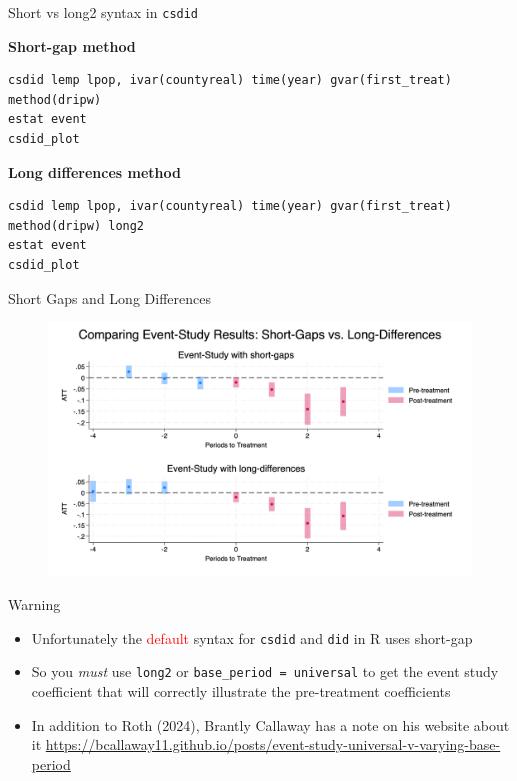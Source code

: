 \documentclass{beamer}
\begin{document}
\begin{frame}[fragile]{Short vs long2 syntax in \texttt{csdid}}
\tiny

\textbf{Short-gap method}
\begin{lstlisting}[basicstyle=\ttfamily]
csdid lemp lpop, ivar(countyreal) time(year) gvar(first_treat) method(dripw)
estat event
csdid_plot
\end{lstlisting}


\textbf{Long differences method}
\begin{lstlisting}[basicstyle=\ttfamily]
csdid lemp lpop, ivar(countyreal) time(year) gvar(first_treat) method(dripw) long2
estat event
csdid_plot
\end{lstlisting}
\end{frame}


\begin{frame}{Short Gaps and Long Differences}

\begin{figure}[h]
    \centering
    \includegraphics[width=\linewidth, height=0.8\textheight, keepaspectratio]{./lecture_includes/short_long}
\end{figure}

\end{frame}


\begin{frame}{Warning}

\begin{itemize}
\item Unfortunately the \textcolor{red}{default} syntax for \texttt{csdid} and \texttt{did} in R uses short-gap
\item So you \emph{must} use \texttt{long2} or \texttt{base_period = universal} to get the event study coefficient that will correctly illustrate the pre-treatment coefficients
\item In addition to Roth (2024), Brantly Callaway has a note on his website about it \url{https://bcallaway11.github.io/posts/event-study-universal-v-varying-base-period}
\end{itemize}

\end{frame}
\end{document}
